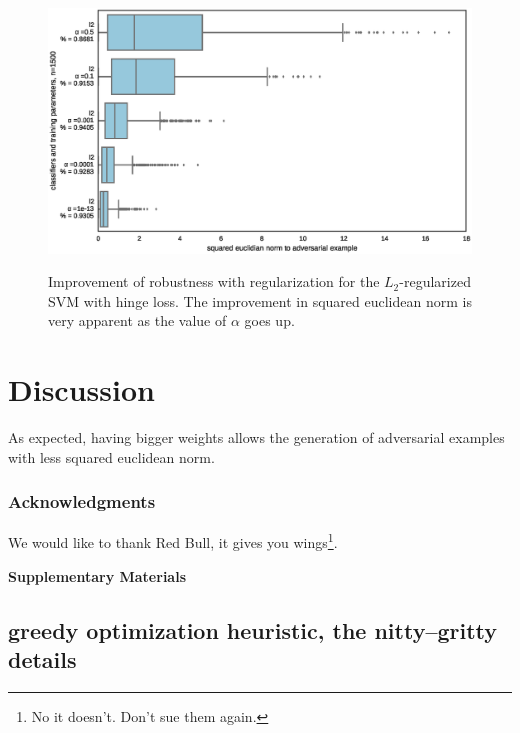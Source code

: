 \documentclass{article} %
\begin{document}
\begin{figure}[h!]
 \includegraphics[scale=0.5]{figs/experiment_2_l2}
 \label{res:exp2}
 \caption{\small Improvement of robustness with regularization for the $L_2$-regularized SVM with hinge loss. The improvement in squared euclidean norm is very apparent as the value of $\alpha$ goes up.}
\end{figure}




\section{Discussion}

As expected, having bigger weights allows the generation of adversarial examples with less
squared euclidean norm.


\subsubsection*{Acknowledgments}
We would like to thank Red Bull, it gives you wings\footnote{No it doesn't. Don't sue them again.}.








\newpage


\begin{center}
\textbf{\large Supplementary Materials}
\end{center}

\subsection{greedy optimization heuristic, the nitty–gritty details}
\label{greedy:proof}
\end{document}
